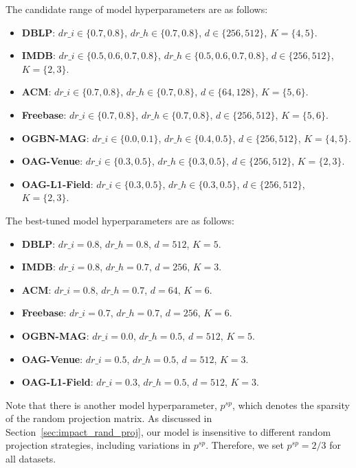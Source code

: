 \documentclass[lettersize,journal]{IEEEtran}
\begin{document}
The candidate range of model hyperparameters are as follows:
\begin{itemize}
\item \textbf{DBLP}: $dr\_i \in \{0.7, 0.8\}$, $dr\_h \in \{0.7, 0.8\}$, $d \in \{256, 512\}$, $K=\{4, 5\}$.
\item \textbf{IMDB}: $dr\_i \in \{0.5, 0.6, 0.7, 0.8\}$, $dr\_h \in \{0.5, 0.6, 0.7, 0.8\}$, $d \in \{256, 512\}$, $K=\{2, 3\}$.
\item \textbf{ACM}: $dr\_i \in \{0.7, 0.8\}$, $dr\_h \in \{0.7, 0.8\}$, $d \in \{64, 128\}$, $K=\{5, 6\}$.
\item \textbf{Freebase}: $dr\_i \in \{0.7, 0.8\}$, $dr\_h \in \{0.7, 0.8\}$, $d \in \{256, 512\}$, $K=\{5, 6\}$.
\item \textbf{OGBN-MAG}: $dr\_i \in \{0.0, 0.1\}$, $dr\_h \in \{0.4, 0.5\}$, $d \in \{256, 512\}$, $K=\{4, 5\}$.
\item \textbf{OAG-Venue}: $dr\_i \in \{0.3, 0.5\}$, $dr\_h \in \{0.3, 0.5\}$, $d \in \{256, 512\}$, $K=\{2, 3\}$.
\item \textbf{OAG-L1-Field}: $dr\_i \in \{0.3, 0.5\}$, $dr\_h \in \{0.3, 0.5\}$, $d \in \{256, 512\}$, $K=\{2, 3\}$.
\end{itemize}


The best-tuned model hyperparameters are as follows:
\begin{itemize}
\item \textbf{DBLP}: $dr\_i=0.8$, $dr\_h=0.8$, $d=512$, $K=5$.
\item \textbf{IMDB}: $dr\_i=0.8$, $dr\_h=0.7$, $d=256$, $K=3$.
\item \textbf{ACM}: $dr\_i=0.8$, $dr\_h=0.7$, $d=64$, $K=6$.
\item \textbf{Freebase}: $dr\_i=0.7$, $dr\_h=0.7$, $d=256$, $K=6$.
\item \textbf{OGBN-MAG}: $dr\_i=0.0$, $dr\_h=0.5$, $d=512$, $K=5$.
\item \textbf{OAG-Venue}: $dr\_i=0.5$, $dr\_h=0.5$, $d=512$, $K=3$.
\item \textbf{OAG-L1-Field}: $dr\_i=0.3$, $dr\_h=0.5$, $d=512$, $K=3$.
\end{itemize}
Note that there is another model hyperparameter, $p^{sp}$, which denotes the sparsity of the random projection matrix.
As discussed in Section~\ref{sec:impact_rand_proj}, our model is insensitive to different random projection strategies, including variations in $p^{sp}$.
Therefore, we set $p^{sp}=2/3$ for all datasets.
\end{document}
